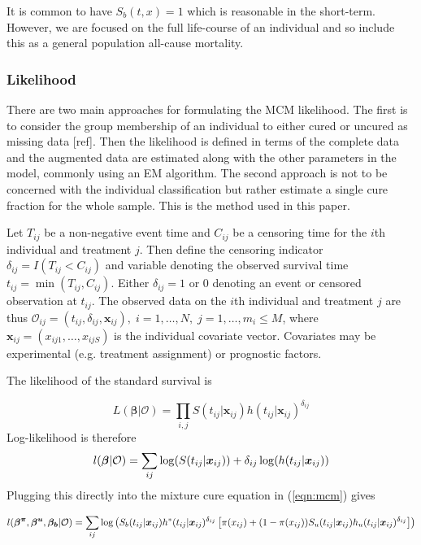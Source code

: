 \documentclass[AMA,STIX1COL]{WileyNJD-v2}
\begin{document}
It is common to have $S_b(t, x) = 1$ which is reasonable in the short-term.
However, we are focused on the full life-course of an individual and so include this as a general population all-cause mortality.


\subsubsection{Likelihood}
There are two main approaches for formulating the MCM likelihood.
The first is to consider the group membership of an individual to either cured or uncured as missing data [ref].
Then the likelihood is defined in terms of the complete data and the augmented data are estimated along with the other parameters in the model, commonly using an EM algorithm.
The second approach is not to be concerned with the individual classification but rather estimate a single cure fraction for the whole sample.
This is the method used in this paper.

Let $T_{ij}$ be a non-negative event time and $C_{ij}$ be a censoring time for the $i$th individual and treatment $j$.
Then define the censoring indicator $\delta_{ij} = I(T_{ij} < C_{ij})$ and variable denoting the observed survival time $t_{ij} = \min(T_{ij}, C_{ij})$.
Either $\delta_{ij} = 1$ or $0$ denoting an event or censored observation at $t_{ij}$.
The observed data on the $i$th individual and treatment $j$ are thus
$\mathcal{O}_{ij} = (t_{ij}, \delta_{ij}, \boldsymbol{x}_{ij}),\; i = 1, \ldots, N, \; j = 1, \ldots, m_i \leq M$,
where $\boldsymbol{x}_{ij} = (x_{ij1}, \ldots, x_{ijS})$ is the individual covariate vector.
Covariates may be experimental (e.g. treatment assignment) or prognostic factors.

The likelihood of the standard survival is

\begin{equation*}
L(\boldsymbol{\beta} | \mathcal{O}) =
\prod_{i,j} S(t_{ij} | \boldsymbol{x}_{ij}) h(t_{ij} | \boldsymbol{x}_{ij})^{\delta_{ij}}
\end{equation*}
Log-likelihood is therefore
$$
\mathnormal{l}(\boldsymbol{\beta} | \mathcal{O}) =
\sum_{ij} \log(S(t_{ij} | \boldsymbol{x}_{ij})) + \delta_{ij} \log(h(t_{ij} | \boldsymbol{x}_{ij}))
$$
Plugging this directly into the mixture cure equation in (\ref{eqn:mcm}) gives

\begin{equation}
\label{separate_lik}
\mathnormal{l}(\boldsymbol{\beta^{\pi}}, \boldsymbol{\beta^{u}}, \boldsymbol{\beta_b} | \mathcal{O}) =
\sum_{ij} \log\left( S_b(t_{ij} | \boldsymbol{x}_{ij}) h^*(t_{ij} | \boldsymbol{x}_{ij})^{\delta_{ij}} \left[\pi(x_{ij}) +
   (1 - \pi(x_{ij})) S_u(t_{ij} | \boldsymbol{x}_{ij}) h_u(t_{ij} | \boldsymbol{x}_{ij})^{\delta_{ij}} \right] \right)
\end{equation}
\end{document}
